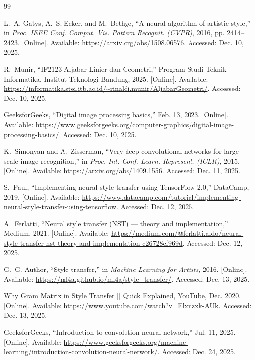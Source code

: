 \begin{thebibliography}{99}

L.~A. Gatys, A.~S. Ecker, and M.~Bethge, ``A neural algorithm of artistic style,'' in \emph{Proc. IEEE Conf. Comput. Vis. Pattern Recognit. (CVPR)}, 2016, pp. 2414--2423. [Online]. Available: \url{https://arxiv.org/abs/1508.06576}. Accessed: Dec. 10, 2025.

R.~Munir, ``IF2123 Aljabar Linier dan Geometri,'' Program Studi Teknik Informatika, Institut Teknologi Bandung, 2025. [Online]. Available: \url{https://informatika.stei.itb.ac.id/~rinaldi.munir/AljabarGeometri/}. Accessed: Dec. 10, 2025.

GeeksforGeeks, ``Digital image processing basics,'' Feb. 13, 2023. [Online]. Available: \url{https://www.geeksforgeeks.org/computer-graphics/digital-image-processing-basics/}. Accessed: Dec. 10, 2025.

K.~Simonyan and A.~Zisserman, ``Very deep convolutional networks for large-scale image recognition,'' in \emph{Proc. Int. Conf. Learn. Represent. (ICLR)}, 2015. [Online]. Available: \url{https://arxiv.org/abs/1409.1556}. Accessed: Dec. 11, 2025.

S.~Paul, ``Implementing neural style transfer using TensorFlow 2.0,'' DataCamp, 2019. [Online]. Available: \url{https://www.datacamp.com/tutorial/implementing-neural-style-transfer-using-tensorflow}. Accessed: Dec. 12, 2025.

A.~Ferlatti, ``Neural style transfer (NST) — theory and implementation,'' Medium, 2021. [Online]. Available: \url{https://medium.com/@ferlatti.aldo/neural-style-transfer-nst-theory-and-implementation-c26728cf969d}. Accessed: Dec. 12, 2025.

G.~G. Author, ``Style transfer,'' in \emph{Machine Learning for Artists}, 2016. [Online]. Available: \url{https://ml4a.github.io/ml4a/style_transfer/}. Accessed: Dec. 13, 2025.

Why Gram Matrix in Style Transfer || Quick Explained, YouTube, Dec. 2020. [Online]. Available: \url{https://www.youtube.com/watch?v=Elxnzxk-AUk}. Accessed: Dec. 13, 2025.

GeeksforGeeks, ``Introduction to convolution neural network,'' Jul. 11, 2025. [Online]. Available: \url{https://www.geeksforgeeks.org/machine-learning/introduction-convolution-neural-network/}. Accessed: Dec. 24, 2025.


\end{thebibliography}
